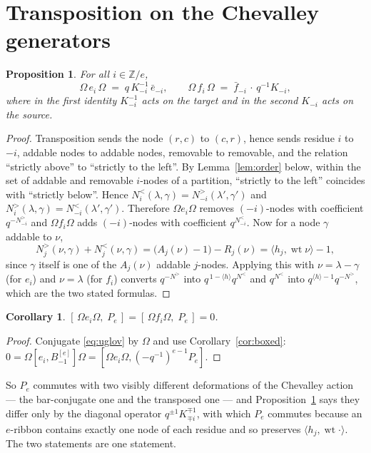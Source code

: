 \documentclass[11pt]{article}
\theoremstyle{plain}
\newtheorem{proposition}[theorem]{Proposition}
\newtheorem{corollary}[theorem]{Corollary}
\theoremstyle{definition}
\newcommand{\Om}{\Omega}
\newcommand{\Bm}{B_{-1}^{[e]}}
\newcommand{\wt}{\operatorname{wt}}
\begin{document}
\section{Transposition on the Chevalley generators}

\begin{proposition}\label{prop:omega-chev}
For all $i\in\mathbb{Z}/e$,
\[
  \Om\,e_i\,\Om \;=\; q\,K_{-i}^{-1}\,\bar e_{-i},
  \qquad
  \Om\,f_i\,\Om \;=\; \bar f_{-i}\,\cdot\,q^{-1}K_{-i},
\]
where in the first identity $K_{-i}^{-1}$ acts on the target and in the second
$K_{-i}$ acts on the source.
\end{proposition}

\begin{proof}
Transposition sends the node $(r,c)$ to $(c,r)$, hence sends residue $i$ to
$-i$, addable nodes to addable nodes, removable to removable, and the relation
``strictly above'' to ``strictly to the left''.  By Lemma~\ref{lem:order}
below, within the set of addable and removable $i$-nodes of a partition,
``strictly to the left'' coincides with ``strictly below''.  Hence
$N^{<}_i(\lambda,\gamma)=N^{>}_{-i}(\lambda',\gamma')$ and
$N^{>}_i(\lambda,\gamma)=N^{<}_{-i}(\lambda',\gamma')$.  Therefore
$\Om e_i\Om$ removes $(-i)$-nodes with coefficient $q^{-N^{>}_{-i}}$ and
$\Om f_i\Om$ adds $(-i)$-nodes with coefficient $q^{N^{<}_{-i}}$.  Now for a
node $\gamma$ addable to $\nu$,
\[
  N^{>}_j(\nu,\gamma)+N^{<}_j(\nu,\gamma)
  = \bigl(A_j(\nu)-1\bigr)-R_j(\nu)
  = \langle h_j,\wt\nu\rangle-1 ,
\]
since $\gamma$ itself is one of the $A_j(\nu)$ addable $j$-nodes.  Applying
this with $\nu=\lambda-\gamma$ (for $e_i$) and $\nu=\lambda$ (for $f_i$)
converts $q^{-N^{>}}$ into $q^{\,1-\langle h\rangle}q^{N^{<}}$ and $q^{N^{<}}$
into $q^{\langle h\rangle-1}q^{-N^{>}}$, which are the two stated formulas.
\end{proof}

\begin{corollary}\label{cor:t2-transposed}
$[\,\Om e_i\Om,\;P_e\,]=[\,\Om f_i\Om,\;P_e\,]=0$.
\end{corollary}
\begin{proof}
Conjugate \eqref{eq:uglov} by $\Om$ and use Corollary~\ref{cor:boxed}:
$0=\Om[e_i,\Bm]\Om=[\Om e_i\Om,(-q^{-1})^{e-1}P_e]$.
\end{proof}

So $P_e$ commutes with two visibly different deformations of the Chevalley
action --- the bar-conjugate one and the transposed one --- and
Proposition~\ref{prop:omega-chev} says they differ only by the diagonal
operator $q^{\pm1}K_{\mp i}^{\mp1}$, with which $P_e$ commutes because an
$e$-ribbon contains exactly one node of each residue and so preserves
$\langle h_j,\wt\cdot\rangle$.  The two statements are one statement.
\end{document}
